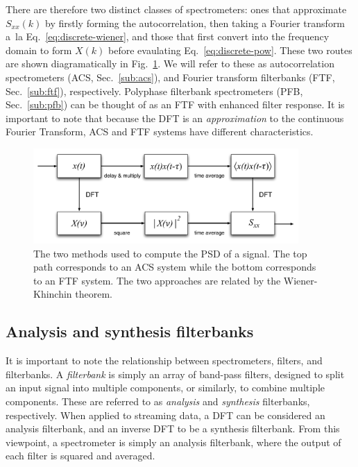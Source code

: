\documentclass{ws-rv961x669}
\begin{document}
There are therefore two distinct classes of spectrometers: ones that approximate $S_{xx}(k)$ by firstly forming the autocorrelation, then taking a Fourier transform a~la Eq.~\ref{eq:discrete-wiener}, and those that first convert into the frequency domain to form $X(k)$ before evaulating Eq.~\ref{eq:discrete-pow}. These two routes are shown diagramatically in Fig.~\ref{fig:wiener}. We will refer to these as autocorrelation spectrometers (ACS, Sec.~\ref{sub:acs}), and Fourier transform filterbanks (FTF, Sec.~\ref{sub:ftf}), respectively. Polyphase filterbank spectrometers (PFB, Sec.~\ref{sub:pfb}) can be thought of as an  FTF with enhanced filter response. It is important to note that because the DFT is an \emph{approximation} to the continuous Fourier Transform, ACS and FTF systems have different characteristics. 

\begin{figure}[t]
 \centering
 \includegraphics[width=0.9\textwidth]{./figures/wiener}
 \caption{The two methods used to compute the PSD of a signal. The top path corresponds to an ACS system while the bottom corresponds to an FTF system. The two approaches are related by the Wiener-Khinchin theorem. \label{fig:wiener}  }
\end{figure}

\subsection{Analysis and synthesis filterbanks}

It is important to note the relationship between spectrometers, filters, and filterbanks. A \emph{filterbank} is simply an array of band-pass filters, designed to split an input signal into multiple components, or similarly, to combine multiple components. These are referred to as \emph{analysis} and \emph{synthesis} filterbanks, respectively. When applied to streaming data, a DFT can be considered an analysis filterbank, and an inverse DFT to be a synthesis filterbank. From this viewpoint, a spectrometer is simply an analysis filterbank, where the output of each filter is squared and averaged.
\end{document}
